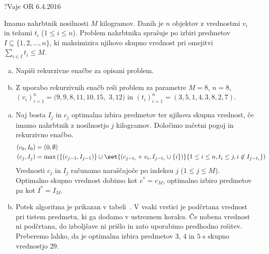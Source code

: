 \begin{naloga}{?}{Vaje OR 6.4.2016}
\begin{vprasanje}
Imamo nahrbtnik nosilnosti $M$ kilogramov.
Danih je $n$ objektov z vrednostmi $v_i$ in težami $t_i$ ($1 \le i \le n$).
Problem nahrbtnika sprašuje po izbiri predmetov
$I \subseteq \{1, 2, \dots, n\}$,
ki maksimizira njihovo skupno vrednost pri omejitvi $\sum_{i \in I} t_i \le M$.
\begin{enumerate}[(a)]
\item Napiši rekurzivne enačbe za opisani problem.
\item Z uporabo rekurzivnih enačb reši problem za parametre $M = 8$, $n = 8$,
$(v_i)_{i=1}^n = (9, 9, 8, 11, 10, 15,$ $3, 12)$ in
$(t_i)_{i=1}^n = (3, 5, 1, 4, 3, 8, 2, 7)$.
\end{enumerate}
\end{vprasanje}

\begin{odgovor}
\begin{enumerate}[(a)]
\item Naj bosta $I_j$ in $c_j$
optimalna izbira predmetov ter njihova skupna vrednost,
če imamo nahrbtnik z nosilnostjo $j$ kilogramov.
Določimo začetni pogoj in rekurzivno enačbo.
\begin{align*}
(c_0, I_0) &= (0, \emptyset) \\
(c_j, I_j) &= \max\left(\{(c_{j-1}, I_{j-1})\} \cup
    \set{(c_{j-t_i} + v_i, I_{j-t_i} \cup \{i\})}%
        {1 \le i \le n, t_i \le j, i \not\in I_{j-t_i}}\right)
\end{align*}
Vrednosti $c_j$ in $I_j$ računamo naraščajoče po indeksu $j$
($1 \le j \le M$).
Optimalno skupno vrednost dobimo kot $c^* = c_M$,
optimalno izbiro predmetov pa kot $I^* = I_M$.

\item Potek algoritma je prikazan v tabeli~\tab.
V vsaki vrstici je podčrtana vrednost pri tistem predmetu,
ki ga dodamo v ustreznem koraku.
Če nobena vred\-nost ni podčrtana,
do izboljšave ni prišlo in zato uporabimo predhodno rešitev.
Preberemo lahko,
da je optimalna izbira predmetov $3$, $4$ in $5$ s skupno vrednostjo $29$.
\end{enumerate}


\end{odgovor}
\end{naloga}

